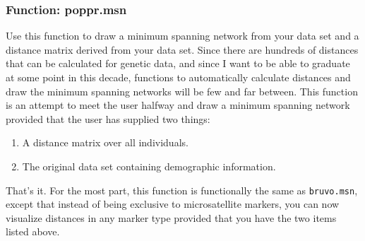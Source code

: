 \documentclass[letterpaper]{article}
\newcommand{\tab}{\hspace*{1em}}
\begin{document}
\subsubsection{Function: poppr.msn}\label{index:trees:poppr.msn}

\tab\tab Use this function to draw a minimum spanning network from your data set and a distance matrix derived from your data set. Since there are hundreds of distances that can be calculated for genetic data, and since I want to be able to graduate at some point in this decade, functions to automatically calculate distances and draw the minimum spanning networks will be few and far between. This function is an attempt to meet the user halfway and draw a minimum spanning network provided that the user has supplied two things:
\begin{enumerate}
  \item A distance matrix over all individuals.
  \item The original data set containing demographic information.
\end{enumerate}

That's it. For the most part, this function is functionally the same as \texttt{bruvo.msn}, except that instead of being exclusive to microsatellite markers, you can now visualize distances in any marker type provided that you have the two items listed above.
\end{document}
